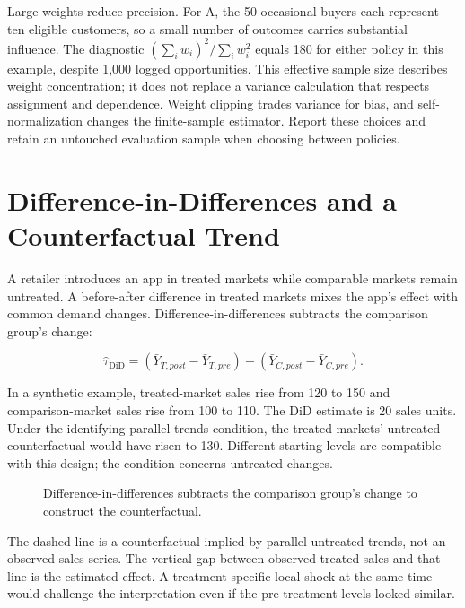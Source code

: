 Large weights reduce precision. For A, the 50 occasional buyers each
represent ten eligible customers, so a small number of outcomes carries
substantial influence. The diagnostic \((\sum_i w_i)^2/\sum_i w_i^2\)
equals 180 for either policy in this example, despite 1,000 logged
opportunities. This effective sample size describes weight
concentration; it does not replace a variance calculation that respects
assignment and dependence. Weight clipping trades variance for bias, and
self-normalization changes the finite-sample estimator. Report these
choices and retain an untouched evaluation sample when choosing between
policies.

\hypertarget{M06-difference-in-differences-and-a-counterfactual-trend}{%
\section{Difference-in-Differences and a Counterfactual
Trend}\label{M06-difference-in-differences-and-a-counterfactual-trend}}

\noindent A retailer introduces an app in treated markets while comparable markets
remain untreated. A before-after difference in treated markets mixes the
app's effect with common demand changes. Difference-in-differences
subtracts the comparison group's change:

\[
\hat\tau_{\mathrm{DiD}}=(\bar Y_{T,post}-\bar Y_{T,pre})-(\bar Y_{C,post}-\bar Y_{C,pre}).
\]

In a synthetic example, treated-market sales rise from 120 to 150 and
comparison-market sales rise from 100 to 110. The DiD estimate is 20
sales units. Under the identifying parallel-trends condition, the
treated markets' untreated counterfactual would have risen to 130.
Different starting levels are compatible with this design; the condition
concerns untreated changes.

\begin{figure}[htbp]
\centering

\caption{Difference-in-differences subtracts the comparison group’s change to construct the counterfactual.}\label{fig:M06_did}
\end{figure}

The dashed line is a counterfactual implied by parallel untreated
trends, not an observed sales series. The vertical gap between observed
treated sales and that line is the estimated effect. A
treatment-specific local shock at the same time would challenge the
interpretation even if the pre-treatment levels looked similar.

